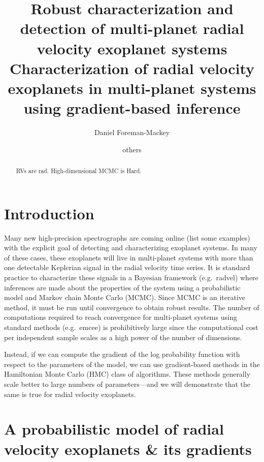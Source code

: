 \documentclass[modern]{aastex62}
\begin{document}
\raggedbottom\sloppy\sloppypar\frenchspacing

\title{%
Robust characterization and detection of multi-planet radial velocity
exoplanet systems
Characterization of radial velocity exoplanets in multi-planet systems using
gradient-based inference
}

\author[0000-0002-9328-5652]{Daniel Foreman-Mackey}

\author{others}

\begin{abstract}

RVs are rad.
High-dimensional MCMC is Hard.

\end{abstract}


\section{Introduction}

Many new high-precision spectrographs are coming online (list some examples)
with the explicit goal of detecting and characterizing exoplanet systems.
In many of these cases, these exoplanets will live in multi-planet systems
with more than one detectable Keplerian signal in the radial velocity time
series.
It is standard practice to characterize these signals in a Bayesian framework
(e.g.~radvel) where inferences are made about the properties of the system
using a probabilistic model and Markov chain Monte Carlo (MCMC).
Since MCMC is an iterative method, it must be run until convergence to obtain
robust results.
The number of computations required to reach convergence for multi-planet
systems using standard methods (e.g.~emcee) is prohibitively large since the
computational cost per independent sample scales as a high power of the number
of dimensions.

Instead, if we can compute the gradient of the log probability function with
respect to the parameters of the model, we can use gradient-based methods in
the Hamiltonian Monte Carlo (HMC) class of algorithms.
These methods generally scale better to large numbers of parameters---and we
will demonstrate that the same is true for radial velocity exoplanets.

\section{A probabilistic model of radial velocity exoplanets \& its gradients}
\end{document}
